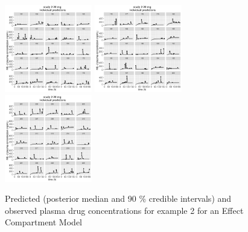 \documentclass[11pt]{amsart}
\begin{document}
\begin{figure}[htbp]
\includegraphics[width=1.5in,trim=0in 0in 0 0in]{graphics/effCptModelTorsten_0.82/effCptPlots020.pdf}
\includegraphics[width=1.5in,trim=0in 0in 0 0in]{graphics/effCptModelTorsten_0.82/effCptPlots021.pdf}
\includegraphics[width=1.5in,trim=0in 0in 0 0in]{graphics/effCptModelTorsten_0.82/effCptPlots022.pdf}
\caption{{Predicted (posterior median and 90 \% credible intervals) and observed plasma drug concentrations for example 2 for an Effect Compartment Model}}
\label{effCptModelPredictionsPK}
\end{figure}
\end{document}
